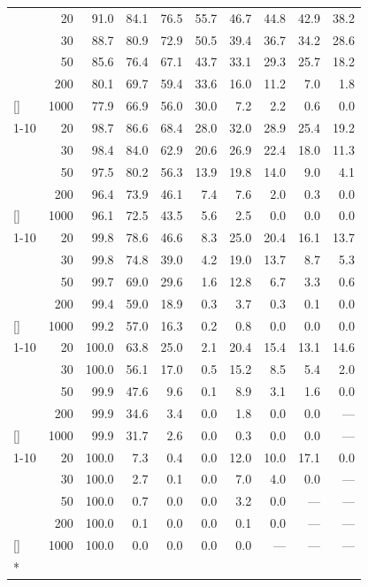 \documentclass[
  nonatbib,
  authoryear,
  preprint]{elsarticle}
\begin{document}
\begin{longtable}[t]{lrrrrrrrrr}
\endfoot
\bottomrule
\endlastfoot
 & 20 & 91.0 & 84.1 & 76.5 & 55.7 & 46.7 & 44.8 & 42.9 & 38.2\\
\nopagebreak
 & 30 & 88.7 & 80.9 & 72.9 & 50.5 & 39.4 & 36.7 & 34.2 & 28.6\\
\nopagebreak
 & 50 & 85.6 & 76.4 & 67.1 & 43.7 & 33.1 & 29.3 & 25.7 & 18.2\\
\nopagebreak
 & 200 & 80.1 & 69.7 & 59.4 & 33.6 & 16.0 & 11.2 & 7.0 & 1.8\\
\nopagebreak
\multirow[t]{-4}{*}[\normalbaselineskip]{\raggedright\arraybackslash 5} & 1000 & 77.9 & 66.9 & 56.0 & 30.0 & 7.2 & 2.2 & 0.6 & 0.0\\
\cmidrule{1-10}\pagebreak[0]
 & 20 & 98.7 & 86.6 & 68.4 & 28.0 & 32.0 & 28.9 & 25.4 & 19.2\\
\nopagebreak
 & 30 & 98.4 & 84.0 & 62.9 & 20.6 & 26.9 & 22.4 & 18.0 & 11.3\\
\nopagebreak
 & 50 & 97.5 & 80.2 & 56.3 & 13.9 & 19.8 & 14.0 & 9.0 & 4.1\\
\nopagebreak
 & 200 & 96.4 & 73.9 & 46.1 & 7.4 & 7.6 & 2.0 & 0.3 & 0.0\\
\nopagebreak
\multirow[t]{-4}{*}[\normalbaselineskip]{\raggedright\arraybackslash 10} & 1000 & 96.1 & 72.5 & 43.5 & 5.6 & 2.5 & 0.0 & 0.0 & 0.0\\
\cmidrule{1-10}\pagebreak[0]
 & 20 & 99.8 & 78.6 & 46.6 & 8.3 & 25.0 & 20.4 & 16.1 & 13.7\\
\nopagebreak
 & 30 & 99.8 & 74.8 & 39.0 & 4.2 & 19.0 & 13.7 & 8.7 & 5.3\\
\nopagebreak
 & 50 & 99.7 & 69.0 & 29.6 & 1.6 & 12.8 & 6.7 & 3.3 & 0.6\\
\nopagebreak
 & 200 & 99.4 & 59.0 & 18.9 & 0.3 & 3.7 & 0.3 & 0.1 & 0.0\\
\nopagebreak
\multirow[t]{-4}{*}[\normalbaselineskip]{\raggedright\arraybackslash 15} & 1000 & 99.2 & 57.0 & 16.3 & 0.2 & 0.8 & 0.0 & 0.0 & 0.0\\
\cmidrule{1-10}\pagebreak[0]
 & 20 & 100.0 & 63.8 & 25.0 & 2.1 & 20.4 & 15.4 & 13.1 & 14.6\\
\nopagebreak
 & 30 & 100.0 & 56.1 & 17.0 & 0.5 & 15.2 & 8.5 & 5.4 & 2.0\\
\nopagebreak
 & 50 & 99.9 & 47.6 & 9.6 & 0.1 & 8.9 & 3.1 & 1.6 & 0.0\\
\nopagebreak
 & 200 & 99.9 & 34.6 & 3.4 & 0.0 & 1.8 & 0.0 & 0.0 & ---\\
\nopagebreak
\multirow[t]{-4}{*}[\normalbaselineskip]{\raggedright\arraybackslash 20} & 1000 & 99.9 & 31.7 & 2.6 & 0.0 & 0.3 & 0.0 & 0.0 & ---\\
\cmidrule{1-10}\pagebreak[0]
 & 20 & 100.0 & 7.3 & 0.4 & 0.0 & 12.0 & 10.0 & 17.1 & 0.0\\
\nopagebreak
 & 30 & 100.0 & 2.7 & 0.1 & 0.0 & 7.0 & 4.0 & 0.0 & ---\\
\nopagebreak
 & 50 & 100.0 & 0.7 & 0.0 & 0.0 & 3.2 & 0.0 & --- & ---\\
\nopagebreak
 & 200 & 100.0 & 0.1 & 0.0 & 0.0 & 0.1 & 0.0 & --- & ---\\
\nopagebreak
\multirow[t]{-4}{*}[\normalbaselineskip]{\raggedright\arraybackslash 40} & 1000 & 100.0 & 0.0 & 0.0 & 0.0 & 0.0 & --- & --- & ---\\*


\end{longtable}
\end{document}
